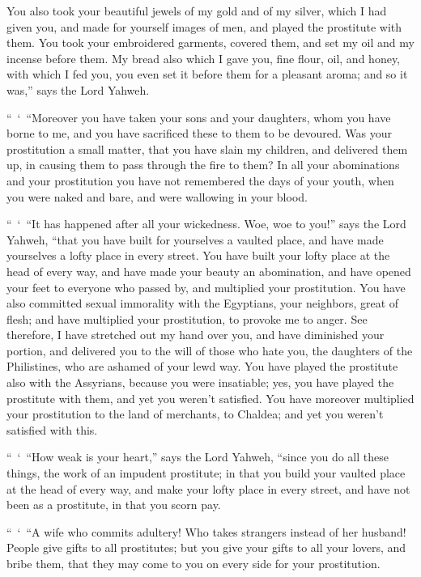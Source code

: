 {You also took your beautiful jewels of my gold and of my silver, which I had given you, and made for yourself images of men, and played the prostitute with them.
You took your embroidered garments, covered them, and set my oil and my incense before them.
My bread also which I gave you, fine flour, oil, and honey, with which I fed you, you even set it before them for a pleasant aroma; and so it was,” says the Lord Yahweh.
\par }{\PP {}“ ‘ “Moreover you have taken your sons and your daughters, whom you have borne to me, and you have sacrificed these to them to be devoured. Was your prostitution a small matter,
that you have slain my children, and delivered them up, in causing them to pass through the fire to them?
In all your abominations and your prostitution you have not remembered the days of your youth, when you were naked and bare, and were wallowing in your blood.
\par }{\PP {}“ ‘ “It has happened after all your wickedness. Woe, woe to you!” says the Lord Yahweh,
“that you have built for yourselves a vaulted place, and have made yourselves a lofty place in every street.
You have built your lofty place at the head of every way, and have made your beauty an abomination, and have opened your feet to everyone who passed by, and multiplied your prostitution.
You have also committed sexual immorality with the Egyptians, your neighbors, great of flesh; and have multiplied your prostitution, to provoke me to anger.
See therefore, I have stretched out my hand over you, and have diminished your portion, and delivered you to the will of those who hate you, the daughters of the Philistines, who are ashamed of your lewd way.
You have played the prostitute also with the Assyrians, because you were insatiable; yes, you have played the prostitute with them, and yet you weren’t satisfied.
You have moreover multiplied your prostitution to the land of merchants, to Chaldea; and yet you weren’t satisfied with this.
\par }{\PP {}“ ‘ “How weak is your heart,” says the Lord Yahweh, “since you do all these things, the work of an impudent prostitute;
in that you build your vaulted place at the head of every way, and make your lofty place in every street, and have not been as a prostitute, in that you scorn pay.
\par }{\PP {}“ ‘ “A wife who commits adultery! Who takes strangers instead of her husband!
People give gifts to all prostitutes; but you give your gifts to all your lovers, and bribe them, that they may come to you on every side for your prostitution.
}
